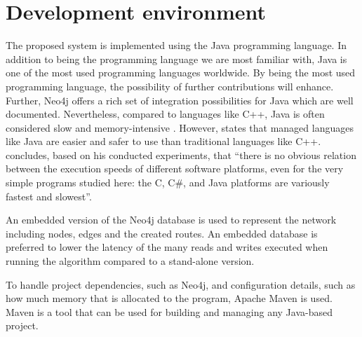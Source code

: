\section{Development environment}

The proposed system is implemented using the Java programming language. In addition to being the programming language we are most familiar with, Java is one of the most used programming languages worldwide. By being the most used programming language, the possibility of further contributions will enhance. Further, Neo4j offers a rich set of integration possibilities for Java which are well documented. Nevertheless, compared to languages like C++, Java is often considered slow and memory-intensive \citep{alnaser12}. However, \citet{sestoft10} states that managed languages like Java are easier and safer to use than traditional languages like C++. \citet{sestoft10} concludes, based on his conducted experiments, that ``there is no obvious relation between the execution speeds of different software platforms, even for the very simple programs studied here: the C, C\#, and Java platforms are variously fastest and slowest''.

An embedded version of the Neo4j database is used to represent the network including nodes, edges and the created routes. An embedded database is preferred to lower the latency of the many reads and writes executed when running the algorithm compared to a stand-alone version. 

To handle project dependencies, such as Neo4j, and configuration details, such as how much memory that is allocated to the program, Apache Maven\citep{website:maven} is used. Maven is a tool that can be used for building and managing any Java-based project. 